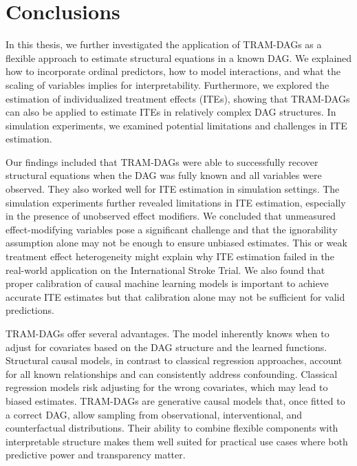 

\chapter{Conclusions}



In this thesis, we further investigated the application of TRAM-DAGs as a flexible approach to estimate structural equations in a known DAG. We explained how to incorporate ordinal predictors, how to model interactions, and what the scaling of variables implies for interpretability. Furthermore, we explored the estimation of individualized treatment effects (ITEs), showing that TRAM-DAGs can also be applied to estimate ITEs in relatively complex DAG structures. In simulation experiments, we examined potential limitations and challenges in ITE estimation. 

\medskip

Our findings included that TRAM-DAGs were able to successfully recover structural equations when the DAG was fully known and all variables were observed. They also worked well for ITE estimation in simulation settings. The simulation experiments further revealed limitations in ITE estimation, especially in the presence of unobserved effect modifiers. We concluded that unmeasured effect-modifying variables pose a significant challenge and that the ignorability assumption alone may not be enough to ensure unbiased estimates. This or weak treatment effect heterogeneity might explain why ITE estimation failed in the real-world application on the International Stroke Trial. We also found that proper calibration of causal machine learning models is important to achieve accurate ITE estimates but that calibration alone may not be sufficient for valid predictions.


\medskip

TRAM-DAGs offer several advantages. The model inherently knows when to adjust for covariates based on the DAG structure and the learned functions. Structural causal models, in contrast to classical regression approaches, account for all known relationships and can consistently address confounding. Classical regression models risk adjusting for the wrong covariates, which may lead to biased estimates. TRAM-DAGs are generative causal models that, once fitted to a correct DAG, allow sampling from observational, interventional, and counterfactual distributions. Their ability to combine flexible components with interpretable structure makes them well suited for practical use cases where both predictive power and transparency matter.

